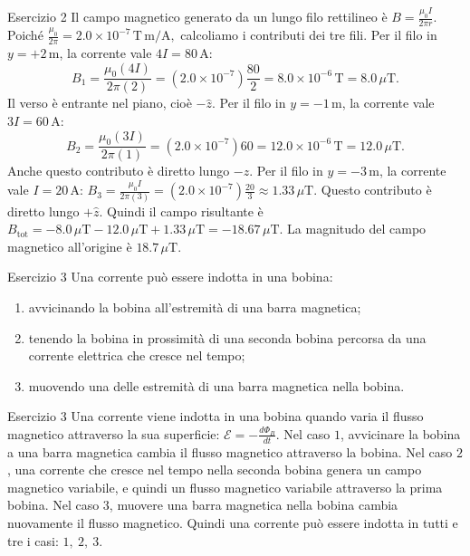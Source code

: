 \documentclass[a4paper]{article}
\begin{document}
\begin{snippetsolution}{Esercizio 2}
    Il campo magnetico generato da un lungo filo rettilineo è
    \(B = \frac{\mu_0 I}{2 \pi r}.\)
    Poiché
    \(\frac{\mu_0}{2\pi} = 2.0 \times 10^{-7}\,\mathrm{T\,m/A},\)
    calcoliamo i contributi dei tre fili.
    Per il filo in \(y = +2\,\mathrm{m}\), la corrente vale \(4I = 80\,\mathrm{A}\):
    \[
        B_1 =
        \frac{\mu_0 (4I)}{2\pi(2)}
        =
        \left(2.0 \times 10^{-7}\right)
        \frac{80}{2}
        =
        8.0 \times 10^{-6}\,\mathrm{T}
        =
        8.0\,\mu\mathrm{T}.
    \]
    Il verso è entrante nel piano, cioè \(-\hat{z}\).
    Per il filo in \(y = -1\,\mathrm{m}\), la corrente vale \(3I = 60\,\mathrm{A}\):
    \[
        B_2 =
        \frac{\mu_0 (3I)}{2\pi(1)}
        =
        \left(2.0 \times 10^{-7}\right)
        60
        =
        12.0 \times 10^{-6}\,\mathrm{T}
        =
        12.0\,\mu\mathrm{T}.
    \]
    Anche questo contributo è diretto lungo \(-\hat{z}\).
    Per il filo in \(y = -3\,\mathrm{m}\), la corrente vale \(I = 20\,\mathrm{A}\):
    \(B_3 = \frac{\mu_0 I}{2\pi(3)} = \left(2.0 \times 10^{-7}\right) \frac{20}{3} \approx 1.33\,\mu\mathrm{T}.\)
    Questo contributo è diretto lungo \(+\hat{z}\).
    Quindi il campo risultante è
    \(B_{\mathrm{tot}} = -8.0\,\mu\mathrm{T} -12.0\,\mu\mathrm{T} +1.33\,\mu\mathrm{T} = -18.67\,\mu\mathrm{T}.\)
    La magnitudo del campo magnetico all'origine è
    \(\boxed{18.7\,\mu\mathrm{T}}.\)
\end{snippetsolution}
\begin{snippetexercise}{Esercizio 3}
    Una corrente può essere indotta in una bobina:
    \begin{enumerate}[nosep]
        \item avvicinando la bobina all'estremità di una barra magnetica;
        \item tenendo la bobina in prossimità di una seconda bobina percorsa da
        una corrente elettrica che cresce nel tempo;
        \item muovendo una delle estremità di una barra magnetica nella bobina.
    \end{enumerate}
\end{snippetexercise}
\begin{snippetsolution}{Esercizio 3}
    Una corrente viene indotta in una bobina quando varia il flusso magnetico
    attraverso la sua superficie:
    \(\mathcal{E} = - \frac{d\Phi_B}{dt}.\)
    Nel caso \(1\), avvicinare la bobina a una barra magnetica cambia il flusso
    magnetico attraverso la bobina.
    Nel caso \(2\), una corrente che cresce nel tempo nella seconda bobina
    genera un campo magnetico variabile, e quindi un flusso magnetico variabile
    attraverso la prima bobina.
    Nel caso \(3\), muovere una barra magnetica nella bobina cambia nuovamente
    il flusso magnetico.
    Quindi una corrente può essere indotta in tutti e tre i casi:
    \(\boxed{1,\ 2,\ 3}.\)
\end{snippetsolution}
\end{document}
